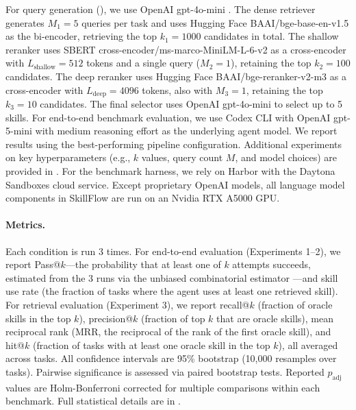 \documentclass[11pt]{article}
\begin{document}
For query generation (), we use OpenAI gpt-4o-mini \citep{hurst2024gpt}.
The dense retriever generates $M_1{=}5$ queries per task and uses Hugging Face BAAI/bge-base-en-v1.5 \citep{xiao2024c} as the bi-encoder, retrieving the top $k_1 = 1000$ candidates in total.
The shallow reranker uses SBERT cross-encoder/ms-marco-MiniLM-L-6-v2 \citep{reimers2019sentence} as a cross-encoder with $L_{\text{shallow}} = 512$ tokens and a single query ($M_2{=}1$), retaining the top $k_2 = 100$ candidates.
The deep reranker uses Hugging Face BAAI/bge-reranker-v2-m3 \citep{chen2024m3} as a cross-encoder with $L_{\text{deep}} = 4096$ tokens, also with $M_3{=}1$, retaining the top $k_3 = 10$ candidates.
The final selector uses OpenAI gpt-4o-mini \citep{hurst2024gpt} to select up to 5 skills.
For end-to-end benchmark evaluation, we use Codex CLI with OpenAI gpt-5-mini \citep{singh2025openai} with medium reasoning effort as the underlying agent model.
We report results using the best-performing pipeline configuration. Additional experiments on key hyperparameters (e.g., $k$ values, query count $M$, and model choices) are provided in .
For the benchmark harness, we rely on Harbor \citep{Harbor_Framework_Team_Harbor_A_framework_2026} with the Daytona Sandboxes cloud service.
Except proprietary OpenAI models, all language model components in SkillFlow are run on an Nvidia RTX A5000 GPU.

\paragraph{Metrics.}
Each condition is run 3 times.
For end-to-end evaluation (Experiments 1--2), we report Pass@$k$---the probability that at least one of $k$ attempts succeeds, estimated from the 3 runs via the unbiased combinatorial estimator \citep{chen2021evaluating}---and skill use rate (the fraction of tasks where the agent uses at least one retrieved skill).
For retrieval evaluation (Experiment 3), we report recall@$k$ (fraction of oracle skills in the top $k$), precision@$k$ (fraction of top $k$ that are oracle skills), mean reciprocal rank (MRR, the reciprocal of the rank of the first oracle skill), and hit@$k$ (fraction of tasks with at least one oracle skill in the top $k$), all averaged across tasks.
All confidence intervals are 95\% bootstrap (10{,}000 resamples over tasks).
Pairwise significance is assessed via paired bootstrap tests. Reported $p_{\text{adj}}$ values are Holm-Bonferroni corrected for multiple comparisons within each benchmark.
Full statistical details are in .
\end{document}
